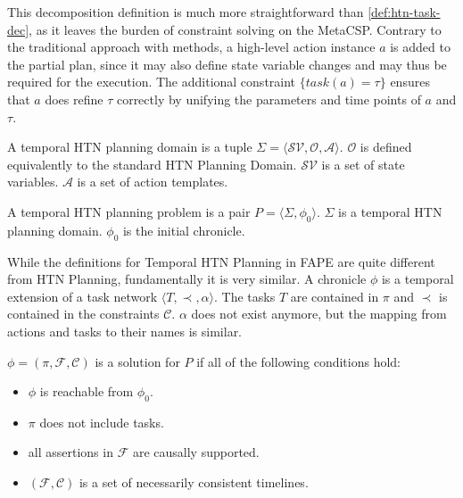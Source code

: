 This decomposition definition is much more straightforward than \ref{def:htn-task-dec}, as it leaves the burden of constraint solving on the MetaCSP.
Contrary to the traditional approach with methods, a high-level action instance $a$ is added to the partial plan, since it may also define state variable changes and may thus be required for the execution.
The additional constraint $\{task(a) = \tau\}$ ensures that $a$ does refine $\tau$ correctly by unifying the parameters and time points of $a$ and $\tau$.

\begin{definition}
  A temporal HTN planning domain is a tuple $\Sigma = \langle \mathcal{SV},\mathcal{O},\mathcal{A} \rangle$.
  $\mathcal{O}$ is defined equivalently to the standard HTN Planning Domain.
  $\mathcal{SV}$ is a set of state variables.
  $\mathcal{A}$ is a set of action templates.
\end{definition}

\begin{definition}
  A temporal HTN planning problem is a pair $P = \langle \Sigma, \phi_0 \rangle$.
  $\Sigma$ is a temporal HTN planning domain.
  $\phi_0$ is the initial chronicle.
\end{definition}

While the definitions for Temporal HTN Planning in FAPE are quite different from HTN Planning, fundamentally it is very similar.
A chronicle $\phi$ is a temporal extension of a task network $\langle T,\prec,\alpha \rangle$.
The tasks $T$ are contained in $\pi$ and $\prec$ is contained in the constraints $\mathcal{C}$.
$\alpha$ does not exist anymore, but the mapping from actions and tasks to their names is similar.


\begin{definition}
  $\phi = (\pi,\mathcal{F},\mathcal{C})$ is a solution for $P$ if all of the following conditions hold:
  \begin{itemize}
    \item $\phi$ is reachable from $\phi_0$.
    \item $\pi$ does not include tasks.
    \item all assertions in $\mathcal{F}$ are causally supported.
    \item $(\mathcal{F},\mathcal{C})$ is a set of necessarily consistent timelines.
  \end{itemize}
\end{definition}

